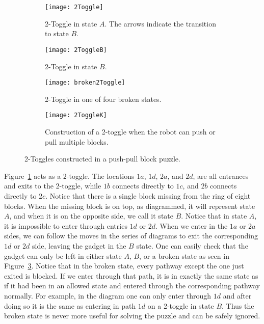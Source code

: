 \begin{figure}[!ht]
\centering
\begin{subfigure}[t]{0.45\textwidth}
  \centering
    \texttt{[image: 2Toggle]}
    \caption{2-Toggle in state $A$. The arrows indicate the transition to state $B$.}
    \label{fig:2toggleA}
\end{subfigure}
\begin{subfigure}[t]{0.45\textwidth}
  \centering
    \texttt{[image: 2ToggleB]}
    \caption{2-Toggle in state $B$.}
    \label{fig:2toggleB}
\end{subfigure}
    \begin{subfigure}[t]{0.45\textwidth}
  \centering
    \texttt{[image: broken2Toggle]}
    \caption{2-Toggle in one of four broken states.}
    \label{fig:broken2toggle}
    \end{subfigure}
  \begin{subfigure}[t]{.45\textwidth}
  \centering
    \texttt{[image: 2ToggleK]}
    \caption{Construction of a 2-toggle when the robot can push or pull multiple blocks.}
    \label{fig:2ToggleK}
    \end{subfigure}
    \caption{2-Toggles constructed in a push-pull block puzzle.}
\end{figure}

Figure~\ref{fig:2toggleA} acts as a 2-toggle. The locations $1a$, $1d$, $2a$, and $2d$, are all entrances and exits to the 2-toggle, while $1b$ connects directly to $1c$, and $2b$ connects directly to $2c$. Notice that there is a single block missing from the ring of eight blocks. When the missing block is on top, as diagrammed, it will represent state $A$, and when it is on the opposite side, we call it state $B$. Notice that in state $A$, it is impossible to enter through entries $1d$ or $2d$. When we enter in the $1a$ or $2a$ sides, we can follow the moves in the series of diagrams to exit the corresponding $1d$ or $2d$ side, leaving the gadget in the $B$ state. One can easily check that the gadget can only be left in either state $A$, $B$, or a broken state as seen in Figure~\ref{fig:broken2toggle}. Notice that in the broken state, every pathway except the one just exited is blocked. If we enter through that path, it is in exactly the same state as if it had been in an allowed state and entered through the corresponding pathway normally. For example, in the diagram one can only enter through $1d$ and after doing so it is the same as entering in path $1d$ on a 2-toggle in state $B$. Thus the broken state is never more useful for solving the puzzle and can be safely ignored.


